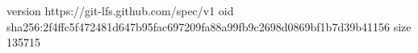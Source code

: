 version https://git-lfs.github.com/spec/v1
oid sha256:2f4ffc5f472481d647b95fac697209fa88a99fb9c2698d0869bf1b7d39b41156
size 135715

